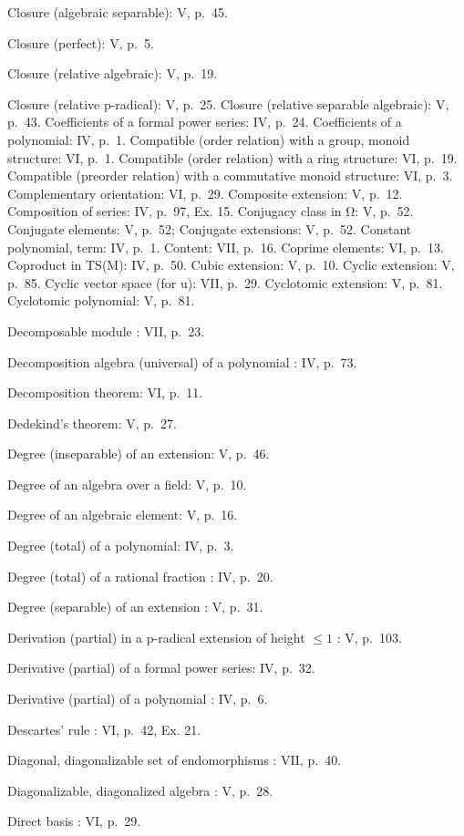 Closure (algebraic separable): V, p.~45.

Closure (perfect): V, p.~5.

Closure (relative algebraic): V, p.~19.

Closure (relative p-radical): V, p.~25. Closure (relative separable algebraic): V, p.~43. Coefficients of a formal power series: IV, p.~24. Coefficients of a polynomial: IV, p.~1. Compatible (order relation) with a group, monoid structure: VI, p.~1. Compatible (order relation) with a ring structure: VI, p.~19. Compatible (preorder relation) with a commutative monoid structure: VI, p.~3. Complementary orientation: VI, p.~29. Composite extension: V, p.~12. Composition of series: IV, p.~97, Ex. 15. Conjugacy class in Ω: V, p.~52. Conjugate elements: V, p.~52; Conjugate extensions: V, p.~52. Constant polynomial, term: IV, p.~1. Content: VII, p.~16. Coprime elements: VI, p.~13. Coproduct in TS(M): IV, p.~50. Cubic extension: V, p.~10. Cyclic extension: V, p.~85. Cyclic vector space (for u): VII, p.~29. Cyclotomic extension: V, p.~81. Cyclotomic polynomial: V, p.~81.

Decomposable module : VII, p.~23.

Decomposition algebra (universal) of a polynomial : IV, p.~73.

Decomposition theorem: VI, p.~11.

Dedekind's theorem: V, p.~27.

Degree (inseparable) of an extension: V, p.~46.

Degree of an algebra over a field: V, p.~10.

Degree of an algebraic element: V, p.~16.

Degree (total) of a polynomial: IV, p.~3.

Degree (total) of a rational fraction : IV, p.~20.

Degree (separable) of an extension : V, p.~31.

Derivation (partial) in a p-radical extension of height \(\leqslant 1\) : V, p.~103.

Derivative (partial) of a formal power series: IV, p.~32.

Derivative (partial) of a polynomial : IV, p.~6.

Descartes' rule : VI, p.~42, Ex. 21.

Diagonal, diagonalizable set of endomorphisms : VII, p.~40.

Diagonalizable, diagonalized algebra : V, p.~28.

Direct basis : VI, p.~29.

